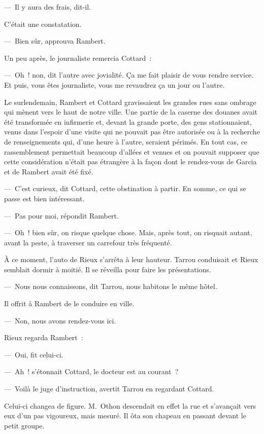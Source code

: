 \documentclass[french,twoside]{book} %
\begin{document}
— Il y aura des frais, dit-il.\par
C’était une constatation.\par
— Bien sûr, approuva Rambert.\par
Un peu après, le journaliste remercia Cottard :\par
— Oh ! non, dit l’autre avec jovialité. Ça me fait plaisir de vous rendre service. Et puis, vous êtes journaliste, vous me revaudrez ça un jour ou l’autre.\par
Le surlendemain, Rambert et Cottard gravissaient les grandes rues sans ombrage qui mènent vers le haut de notre ville. Une partie de la caserne des douanes avait été transformée en infirmerie et, devant la grande porte, des gens stationnaient, venus dans l’espoir d’une visite qui ne pouvait pas être autorisée ou à la recherche de renseignements qui, d’une heure à l’autre, seraient périmés. En tout cas, ce rassemblement permettait beaucoup d’allées et venues et on pouvait supposer que cette considération n’était pas étrangère à la façon dont le rendez-vous de Garcia et de Rambert avait été fixé.\par
— C’est curieux, dit Cottard, cette obstination à partir. En somme, ce qui se passe est bien intéressant.\par
— Pas pour moi, répondit Rambert.\par
— Oh ! bien sûr, on risque quelque chose. Mais, après tout, on risquait autant, avant la peste, à traverser un carrefour très fréquenté.\par
À ce moment, l’auto de Rieux s’arrêta à leur hauteur. Tarrou conduisait et Rieux semblait dormir à moitié. Il se réveilla pour faire les présentations.\par
— Nous nous connaissons, dit Tarrou, nous habitons le même hôtel.\par
Il offrit à Rambert de le conduire en ville.\par
— Non, nous avons rendez-vous ici.\par
Rieux regarda Rambert :\par
— Oui, fit celui-ci.\par
— Ah ! s’étonnait Cottard, le docteur est au courant ?\par
— Voilà le juge d’instruction, avertit Tarrou en regardant Cottard.\par
Celui-ci changea de figure. M. Othon descendait en effet la rue et s’avançait vers eux d’un pas vigoureux, mais mesuré. Il ôta son chapeau en passant devant le petit groupe.\par
\end{document}
